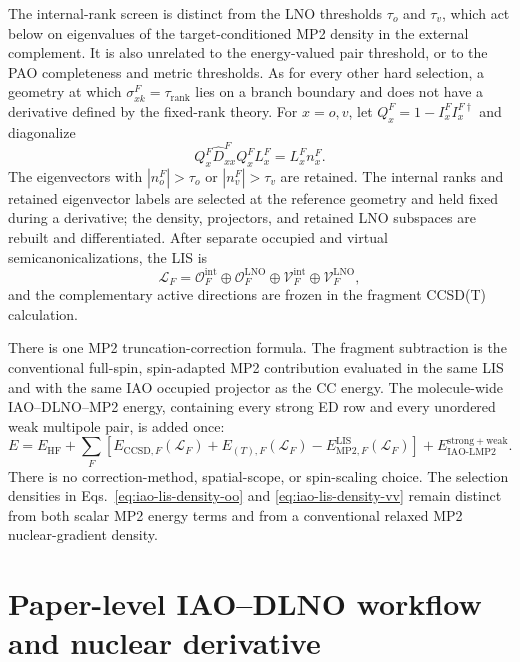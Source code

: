 \documentclass[11pt]{article}
\begin{document}
The internal-rank screen is distinct from the LNO thresholds $\tau_o$ and
$\tau_v$, which act below on eigenvalues of the target-conditioned MP2
density in the external complement.  It is also unrelated to the
energy-valued pair threshold, or to the PAO completeness and metric
thresholds.  As for every other hard selection, a geometry at which
$\sigma_{xk}^F=\tau_{\mathrm{rank}}$ lies on a branch boundary and does not
have a derivative defined by the fixed-rank theory.
For $x=o,v$, let $Q_x^F=1-I_x^FI_x^{F\dagger}$ and diagonalize
\begin{equation}
 Q_x^F\widehat D_{xx}^FQ_x^F L_x^F=L_x^Fn_x^F.
 \label{eq:lno-diagonalization}
\end{equation}
The eigenvectors with $|n_o^F|>\tau_o$ or $|n_v^F|>\tau_v$ are retained.
The internal ranks and retained eigenvector labels are selected at the
reference geometry and held fixed during a derivative; the density,
projectors, and retained LNO subspaces are rebuilt and differentiated.  After
separate occupied and virtual semicanonicalizations, the LIS is
\begin{equation}
 \mathcal L_F =
 \mathcal O_F^{\mathrm{int}}
 \oplus \mathcal O_F^{\mathrm{LNO}}
 \oplus \mathcal V_F^{\mathrm{int}}
 \oplus \mathcal V_F^{\mathrm{LNO}},
 \label{eq:lis-definition}
\end{equation}
and the complementary active directions are frozen in the fragment CCSD(T)
calculation.

There is one MP2 truncation-correction formula.  The fragment subtraction is
the conventional full-spin, spin-adapted MP2 contribution evaluated in the
same LIS and with the same IAO occupied projector as the CC energy.  The
molecule-wide IAO--DLNO--MP2 energy, containing every strong ED row and every
unordered weak multipole pair, is added once:
\begin{equation}
 E=E_{\mathrm{HF}}
   +\sum_F\left[
      E_{\mathrm{CCSD},F}(\mathcal L_F)
      +E_{(T),F}(\mathcal L_F)
      -E_{\mathrm{MP2},F}^{\mathrm{LIS}}(\mathcal L_F)
    \right]
   +E_{\mathrm{IAO\mbox{-}LMP2}}^{\mathrm{strong+weak}}.
 \label{eq:iao-lmp2-cc-correction}
\end{equation}
There is no correction-method, spatial-scope, or spin-scaling choice.  The
selection densities in Eqs.~\eqref{eq:iao-lis-density-oo} and
\eqref{eq:iao-lis-density-vv} remain distinct from both scalar MP2 energy
terms and from a conventional relaxed MP2 nuclear-gradient density.

\section{Paper-level IAO--DLNO workflow and nuclear derivative}
\label{sec:paper-workflow}
\end{document}
